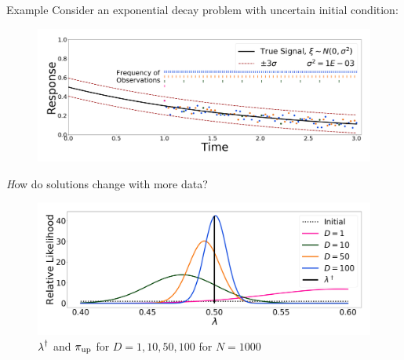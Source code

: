 \begin{block}{Example}
\centering
    Consider an exponential decay problem with uncertain initial condition:
\vspace{-1cm}
    \begin{figure}
        \includegraphics[width=26cm]{exponential_decay_response_sigma-10E-4}
    \end{figure}



\centering
{}
{\emph How do solutions change with more data?}
\vspace{-1cm}
    \begin{figure}
        \includegraphics[width=26cm]{updated_convergence_sigma-10E-4}
        \vspace{-1cm}
        \caption*{ $\operatorname*{\lambda}^\dagger$ and $\operatorname*{\pi_{up}}$ for $D=1, 10, 50, 100$ for $N=1000$}
    \end{figure}




\end{block}
